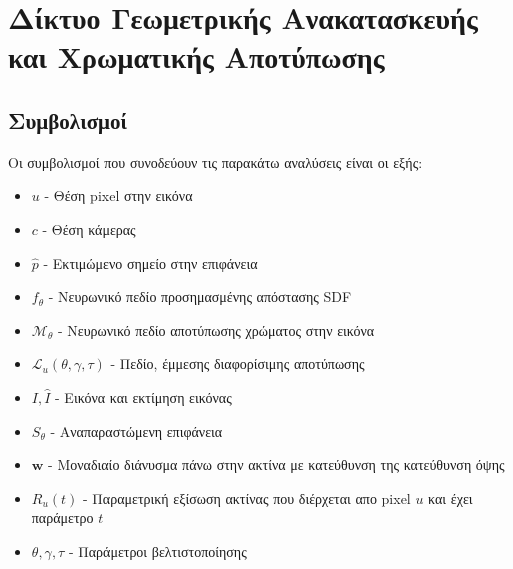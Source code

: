 \section{Δίκτυο Γεωμετρικής Ανακατασκευής και Χρωματικής Αποτύπωσης}
\label{idrnetwork}
\subsection{Συμβολισμοί}
Οι συμβολισμοί που συνοδεύουν τις παρακάτω αναλύσεις είναι οι εξής:
\begin{itemize}
    \item $u$ - Θέση pixel στην εικόνα
    \item $c$ - Θέση κάμερας
    \item $\hat{p}$ - Εκτιμώμενο σημείο στην επιφάνεια
    \item  $f_\theta$ - Νευρωνικό πεδίο προσημασμένης απόστασης SDF 
    \item $\mathcal{M}_\theta$ - Νευρωνικό πεδίο αποτύπωσης χρώματος στην εικόνα
    \item $\mathcal{L}_{u}(\theta, \gamma, \tau)$ - Πεδίο, έμμεσης διαφορίσιμης αποτύπωσης 
    \item $I, \hat{I}$ - Εικόνα και εκτίμηση εικόνας
    \item $S_\theta$ - Αναπαραστώμενη επιφάνεια
    \item $\boldsymbol{w}$ - Μοναδιαίο διάνυσμα πάνω στην ακτίνα με κατεύθυνση της κατεύθυνση όψης
    \item $R_u(t)$ - Παραμετρική εξίσωση ακτίνας που διέρχεται απο pixel $u$ και έχει παράμετρο $t$
    \item $\theta, \gamma, \tau$ - Παράμετροι βελτιστοποίησης
\end{itemize}

